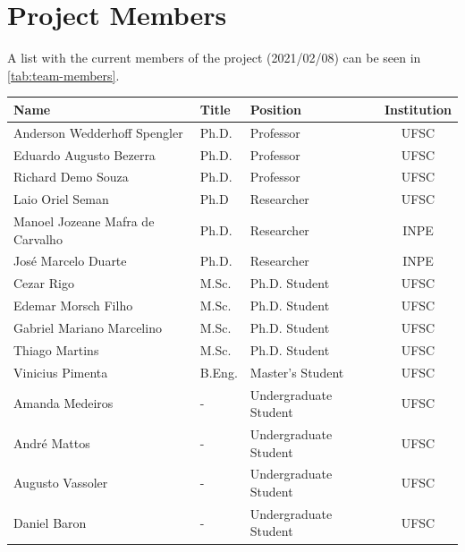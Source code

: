 \section{Project Members}

A list with the current members of the project (2021/02/08) can be seen in \autoref{tab:team-members}.

\begin{table}[ht]
    \centering
    \begin{tabular}{lllc}
        \toprule[1.5pt]
        \textbf{Name} & \textbf{Title} & \textbf{Position} & \textbf{Institution} \\
        \midrule
        Anderson Wedderhoff Spengler        & Ph.D.     & Professor             & UFSC \\
        Eduardo Augusto Bezerra             & Ph.D.     & Professor             & UFSC \\
        Richard Demo Souza                  & Ph.D.     & Professor             & UFSC \\
        Laio Oriel Seman                    & Ph.D      & Researcher            & UFSC \\
        Manoel Jozeane Mafra de Carvalho    & Ph.D.     & Researcher            & INPE \\
        José Marcelo Duarte                 & Ph.D.     & Researcher            & INPE \\
        Cezar Rigo                          & M.Sc.     & Ph.D. Student         & UFSC \\
        Edemar Morsch Filho                 & M.Sc.     & Ph.D. Student         & UFSC \\
        Gabriel Mariano Marcelino           & M.Sc.     & Ph.D. Student         & UFSC \\
        Thiago Martins                      & M.Sc.     & Ph.D. Student         & UFSC \\
        Vinicius Pimenta                    & B.Eng.    & Master's Student      & UFSC \\
        Amanda Medeiros                     & -         & Undergraduate Student & UFSC \\
        André Mattos                        & -         & Undergraduate Student & UFSC \\
        Augusto Vassoler                    & -         & Undergraduate Student & UFSC \\
        Daniel Baron                        & -         & Undergraduate Student & UFSC \\

\end{tabular}
\end{table}
